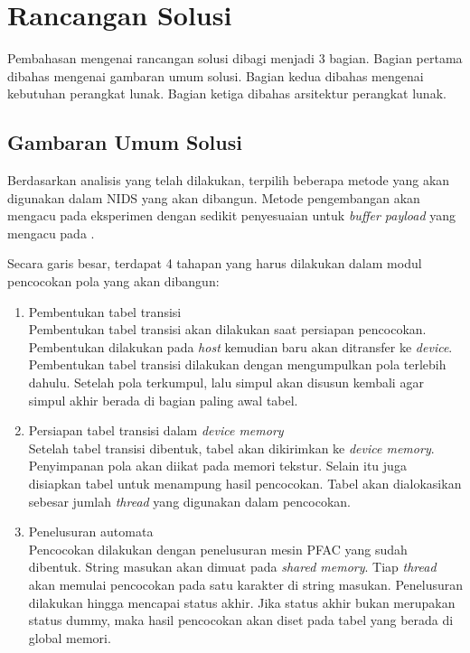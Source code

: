   \section{Rancangan Solusi}

    Pembahasan mengenai rancangan solusi dibagi menjadi 3 bagian. Bagian pertama dibahas mengenai gambaran umum solusi. Bagian kedua dibahas mengenai kebutuhan perangkat lunak. Bagian ketiga dibahas arsitektur perangkat lunak. 

    \subsection{Gambaran Umum Solusi}

      Berdasarkan  analisis  yang  telah  dilakukan, terpilih beberapa metode yang akan digunakan dalam NIDS yang akan dibangun. Metode pengembangan akan mengacu pada eksperimen \cite{lin2013} dengan sedikit penyesuaian untuk \emph{buffer payload} yang mengacu pada \cite{gnort2008}.
      

      Secara garis besar, terdapat 4 tahapan yang harus dilakukan dalam modul pencocokan pola yang akan dibangun:

      \begin{enumerate}

      \item
      Pembentukan tabel transisi \\
      Pembentukan tabel transisi akan dilakukan saat persiapan pencocokan. Pembentukan dilakukan pada \emph{host} kemudian baru akan ditransfer ke \emph{device}. Pembentukan tabel transisi dilakukan dengan mengumpulkan pola terlebih dahulu. Setelah pola terkumpul, lalu simpul akan disusun kembali agar simpul akhir berada di bagian paling awal tabel. 

      \item
      Persiapan tabel transisi dalam \emph{device memory} \\
      Setelah tabel transisi dibentuk, tabel akan dikirimkan ke \emph{device memory}. Penyimpanan pola akan diikat pada memori tekstur. Selain itu juga disiapkan tabel untuk menampung hasil pencocokan. Tabel akan dialokasikan sebesar jumlah \emph{thread} yang digunakan dalam pencocokan.

      \item
      Penelusuran automata \\
      Pencocokan dilakukan dengan penelusuran mesin PFAC yang sudah dibentuk. String masukan akan dimuat pada \emph{shared memory}. Tiap \emph{thread} akan memulai pencocokan pada satu karakter di string masukan. Penelusuran dilakukan hingga mencapai status akhir. Jika status akhir bukan merupakan status dummy, maka hasil pencocokan akan diset pada tabel yang berada di global memori.

      \end{enumerate}

